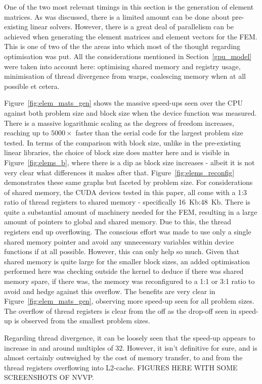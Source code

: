 One of the two most relevant timings in this section is the generation of element matrices. As was discussed, there is a limited amount can be done about pre-existing linear solvers. However, there is a great deal of parallelism can be achieved when generating the element matrices and element vectors for the FEM. This is one of two of the the areas into which most of the thought regarding optimisation was put. All the considerations mentioned in Section~\ref{gpu_model} were taken into account here: optimising shared memory and registry usage, minimisation of thread divergence from warps, coalescing memory when at all possible et cetera.

Figure~\ref{fig:elem_mats_gen} shows the massive speed-ups seen over the CPU against both problem size and block size when the device function was measured. There is a massive logarithmic scaling as the degrees of freedom increases, reaching up to $5000\times$ faster than the serial code for the largest problem size tested. In terms of the comparison with block size, unlike in the pre-existing linear libraries, the choice of block size does matter here and is visible in Figure~\ref{fig:elems_b}, where there is a dip as block size increases - albeit it is not very clear what differences it makes after that. Figure~\ref{fig:elems_reconfig} demonstrates these same graphs but faceted by problem size. For considerations of shared memory, the CUDA devices tested in this paper, all come with a 1:3 ratio of thread registers to shared memory - specifically 16~Kb:48~Kb. There is quite a substantial amount of machinery needed for the FEM, resulting in a large amount of pointers to global and shared memory. Due to this, the thread registers end up overflowing. The conscious effort was made to use only a single shared memory pointer and avoid any unnecessary variables within device functions if at all possible. However, this can only help so much. Given that shared memory is quite large for the smaller block sizes, an added optimisation performed here was checking outside the kernel to deduce if there was shared memory spare, if there was, the memory was reconfigured to a 1:1 or 3:1 ratio to avoid and hedge against this overflow. The benefits are very clear in Figure~\ref{fig:elem_mats_gen}, observing more speed-up seen for all problem sizes. The overflow of thread registers is clear from the off as the drop-off seen in speed-up is observed from the smallest problem sizes.

Regarding thread divergence, it can be loosely seen that the speed-up appears to increase in and around multiples of 32. However, it isn't definitive for sure, and is almost certainly outweighed by the cost of memory transfer, to and from the thread registers overflowing into L2-cache. FIGURES HERE WITH SOME SCREENSHOTS OF NVVP.

